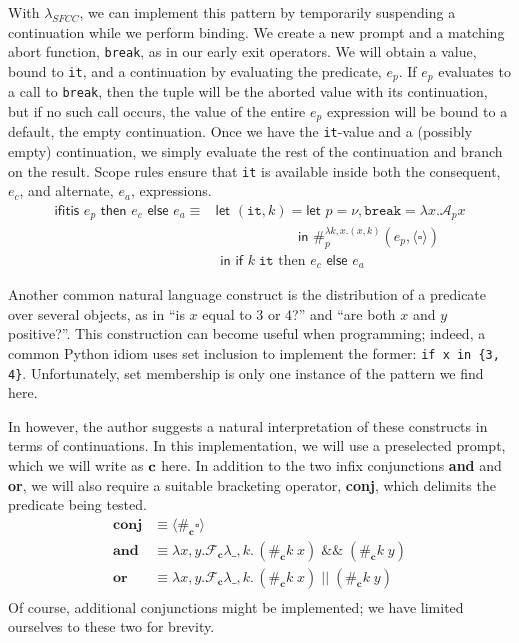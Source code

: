 \documentclass[11pt]{article}
\newcommand\x{\lambda x}
\newcommand{\letin}[2]{\textsf{let }#1\textsf{ in }#2}
\newcommand\F{\mathcal{F}}
\newcommand\A{\mathcal{A}}
\newcommand{\angles}[1]{\langle#1\rangle}
\begin{document}
With $\lambda_{SFCC}$, we can implement this pattern by temporarily suspending a continuation while we perform binding.
We create a new prompt and a matching abort function, \texttt{break}, as in our early exit operators.
We will obtain a value, bound to \texttt{it}, and a continuation by evaluating the predicate, $e_p$.
If $e_p$ evaluates to a call to \texttt{break}, then the tuple will be the aborted value with its continuation, but if no such call occurs, the value of the entire $e_p$ expression will be bound to a default, the empty continuation.
Once we have the \texttt{it}-value and a (possibly empty) continuation, we simply evaluate the rest of the continuation and branch on the result.
Scope rules ensure that \texttt{it} is available inside both the consequent, $e_c$, and alternate, $e_a$, expressions.
\begin{align*}
\textsf{ifitis }e_p\textsf{ then }e_c\textsf{ else }e_a \equiv{}
	&\letin{(\texttt{it}, k) = \letin{p = \nu, \texttt{break} = \x.\A_px
	\\&\qquad\qquad\quad\;\;}{\#_p^{\lambda k,x.(x,k)}(e_p, \angles{\square})}
	\\&}{\textsf{if }k\;\texttt{it}\text{ then }e_c\textsf{ else }e_a}
\end{align*}

Another common natural language construct is the distribution of a predicate over several objects, as in ``is $x$ equal to 3 or 4?'' and ``are both $x$ and $y$ positive?''.
This construction can become useful when programming;
indeed, a common Python idiom uses set inclusion to implement the former: \texttt{if x in \{3, 4\}}.
Unfortunately, set membership is only one instance of the pattern we find here.

In \cite{ContInNatlang} however, the author suggests a natural interpretation of these constructs in terms of continuations.
In this implementation, we will use a preselected prompt, which we will write as $\textbf c$ here.
In addition to the two infix conjunctions \textbf{and} and \textbf{or}, we will also require a suitable bracketing operator, \textbf{conj}, which delimits the predicate being tested.
\begin{align*}
\textbf{conj} &\equiv \angles{\#_\textbf{c}\square} \\
\textbf{and} &\equiv \x,y. \F_\textbf{c}\lambda \_, k.\,(\#_\textbf{c}k\;x)\;\&\&\;(\#_\textbf{c}k\;y) \\
\textbf{or} &\equiv \x,y. \F_\textbf{c}\lambda \_, k.\,(\#_\textbf{c}k\;x)\;||\;(\#_\textbf{c}k\;y) \\
\end{align*}
Of course, additional conjunctions might be implemented; we have limited ourselves to these two for brevity.
\end{document}
